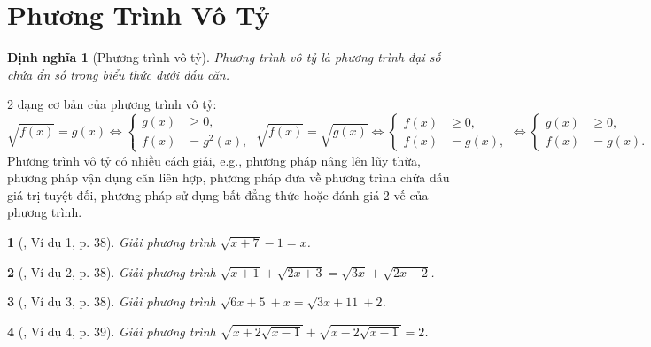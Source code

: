 \documentclass{article}
\newtheorem{baitoan}{}%
\newtheorem{dinhnghia}{Định nghĩa}
\begin{document}

\section{Phương Trình Vô Tỷ}

\begin{dinhnghia}[Phương trình vô tỷ]
	{\rm Phương trình vô tỷ} là phương trình đại số chứa ẩn số trong biểu thức dưới dấu căn.
\end{dinhnghia}
2 dạng cơ bản của phương trình vô tỷ:
\begin{equation*}
	\boxed{\sqrt{f(x)} = g(x)\Leftrightarrow\left\{\begin{split}
		g(x)&\ge0,\\
		f(x) &= g^2(x),
	\end{split}\right.\ \sqrt{f(x)} = \sqrt{g(x)}\Leftrightarrow\left\{\begin{split}
	f(x)&\ge0,\\
	f(x) &= g(x),
	\end{split}\right.\Leftrightarrow\left\{\begin{split}
		g(x)&\ge0,\\
		f(x) &= g(x).
	\end{split}\right.}
\end{equation*}
Phương trình vô tỷ có nhiều cách giải, e.g., phương pháp nâng lên lũy thừa, phương pháp vận dụng căn liên hợp, phương pháp đưa về phương trình chứa dấu giá trị tuyệt đối, phương pháp sử dụng bất đẳng thức hoặc đánh giá 2 vế của phương trình.

\begin{baitoan}[\cite{Binh_boi_duong_Toan_9_tap_1}, Ví dụ 1, p. 38]
	Giải phương trình $\sqrt{x + 7} - 1 = x$.
\end{baitoan}

\begin{baitoan}[\cite{Binh_boi_duong_Toan_9_tap_1}, Ví dụ 2, p. 38]
	Giải phương trình $\sqrt{x + 1} + \sqrt{2x + 3} = \sqrt{3x} + \sqrt{2x - 2}$.
\end{baitoan}

\begin{baitoan}[\cite{Binh_boi_duong_Toan_9_tap_1}, Ví dụ 3, p. 38]
	Giải phương trình $\sqrt{6x + 5} + x = \sqrt{3x + 11} + 2$.
\end{baitoan}

\begin{baitoan}[\cite{Binh_boi_duong_Toan_9_tap_1}, Ví dụ 4, p. 39]
	Giải phương trình $\sqrt{x + 2\sqrt{x - 1}} + \sqrt{x - 2\sqrt{x - 1}} = 2$.
\end{baitoan}
\end{document}
